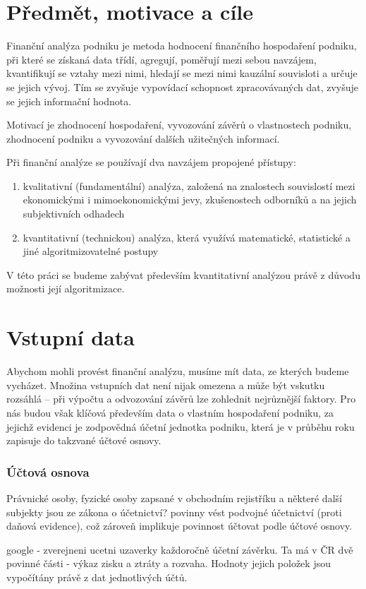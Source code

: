 \section{Předmět, motivace a cíle}
Finanční analýza podniku je metoda hodnocení finančního hospodaření podniku, při které se získaná data třídí, agregují, poměřují mezi sebou navzájem, kvantifikují se vztahy mezi nimi, hledají se mezi nimi kauzální souvisloti a určuje se jejich vývoj. Tím se zvyšuje vypovídací schopnost zpracovávaných dat, zvyšuje se jejich informační hodnota\cite{sedl}.

Motivací je zhodnocení hospodaření, vyvozování závěrů o vlastnostech podniku, zhodnocení podniku a vyvozování dalších užitečných informací.

Při finanční analýze se používají dva navzájem propojené přístupy\cite{kova}:
\begin{enumerate}
	\item kvalitativní (fundamentální) analýza, založená na znalostech souvislostí mezi ekonomickými i mimoekonomickými jevy, zkušenostech odborníků a na jejich subjektivních odhadech
	\item kvantitativní (technickou) analýza, která využívá matematické, statistické a jiné algoritmizovatelné postupy
\end{enumerate}
V této práci se budeme zabývat především kvantitativní analýzou právě z důvodu možnosti její algoritmizace. 

\section{Vstupní data}
Abychom mohli provést finanční analýzu, musíme mít data, ze kterých budeme vycházet. Množina vstupních dat není nijak omezena a může být vskutku rozsáhlá -- při výpočtu a odvozování závěrů lze zohlednit nejrůznější faktory. Pro nás budou však klíčová především data o vlastním hospodaření podniku, za jejichž evidenci je zodpovědná účetní jednotka podniku, která je v průběhu roku zapisuje do takzvané účtové osnovy.
\subsubsection{Účtová osnova}
Právnické osoby, fyzické osoby zapsané v obchodním rejistříku a některé další subjekty jsou ze zákona o účetnictví? povinny vést podvojné účetnictví (proti daňová evidence), což zároveň implikuje povinnost účtovat podle účtové osnovy.

google - zverejneni ucetni uzaverky
každoročně účetní závěrku. Ta má v ČR dvě povinné části - výkaz zisku a ztráty a rozvaha. Hodnoty jejich položek jsou vypočítány právě z dat jednotlivých účtů.
